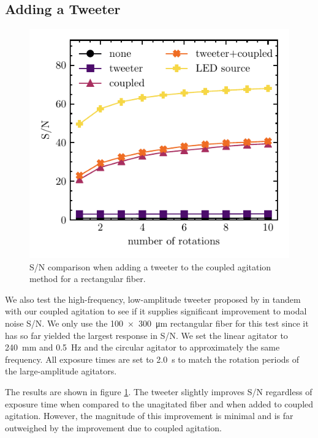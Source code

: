 \documentclass[twocolumn]{emulateapj}
\begin{document}
\subsection{Adding a Tweeter}

\begin{figure}
\centering
	\includegraphics[width=\columnwidth]{images/tweeter_snr.pdf}
	\caption{S/N comparison when adding a tweeter to the coupled agitation method for a rectangular fiber.}
\label{fig:tweeter_snr}
\end{figure}

We also test the high-frequency, low-amplitude tweeter proposed by \citep{Plavchan2013} in tandem with our coupled agitation to see if it supplies significant improvement to modal noise S/N. We only use the \SI{100x300}{\micro\meter} rectangular fiber for this test since it has so far yielded the largest response in S/N. We set the linear agitator to \SI{240}{\milli\meter} and \SI{0.5}{\hertz} and the circular agitator to approximately the same frequency. All exposure times are set to \SI{2.0}{\second} to match the rotation periods of the large-amplitude agitators.

The results are shown in figure \ref{fig:tweeter_snr}. The tweeter slightly improves S/N regardless of exposure time when compared to the unagitated fiber and when added to coupled agitation. However, the magnitude of this improvement is minimal and is far outweighed by the improvement due to coupled agitation.
\end{document}

